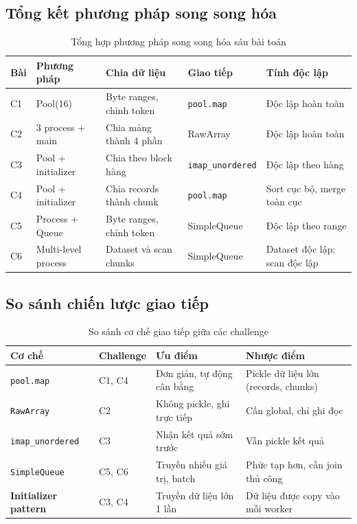 \documentclass[12pt,a4paper]{article}
\begin{document}
\subsection{Tổng kết phương pháp song song hóa}

\begin{table}[H]
\centering
\caption{Tổng hợp phương pháp song song hóa sáu bài toán}
\begingroup
\small
\setlength{\tabcolsep}{4pt}
\renewcommand{\arraystretch}{1.25}
\begin{tabularx}{\textwidth}{p{0.8cm}p{2.6cm}p{2.0cm}p{3.5cm}Y}
\toprule
\textbf{Bài} & \textbf{Phương pháp} & \textbf{Chia dữ liệu} & \textbf{Giao tiếp} & \textbf{Tính độc lập} \\
\midrule
C1 & Pool(16) & Byte ranges, chỉnh token & \texttt{pool.map} & Độc lập hoàn toàn \\
C2 & 3 process + main & Chia mảng thành 4 phần & RawArray & Độc lập hoàn toàn \\
C3 & Pool + initializer & Chia theo block hàng & \texttt{imap\_unordered} & Độc lập theo hàng \\
C4 & Pool + initializer & Chia records thành chunk & \texttt{pool.map} & Sort cục bộ, merge toàn cục \\
C5 & Process + Queue & Byte ranges, chỉnh token & SimpleQueue & Độc lập theo range \\
C6 & Multi-level process & Dataset và scan chunks & SimpleQueue & Dataset độc lập; scan độc lập \\
\bottomrule
\end{tabularx}
\endgroup
\end{table}

\subsection{So sánh chiến lược giao tiếp}

\begin{table}[H]
\centering
\caption{So sánh cơ chế giao tiếp giữa các challenge}
\begin{tabularx}{\textwidth}{p{3.5cm}p{3cm}p{4cm}Y}
\toprule
\textbf{Cơ chế} & \textbf{Challenge} & \textbf{Ưu điểm} & \textbf{Nhược điểm} \\
\midrule
\texttt{pool.map} & C1, C4 & Đơn giản, tự động cân bằng & Pickle dữ liệu lớn (records, chunks) \\
\texttt{RawArray} & C2 & Không pickle, ghi trực tiếp & Cần global, chỉ ghi đọc \\
\texttt{imap\_unordered} & C3 & Nhận kết quả sớm trước & Vẫn pickle kết quả \\
\texttt{SimpleQueue} & C5, C6 & Truyền nhiều giá trị, batch & Phức tạp hơn, cần join thủ công \\
\midrule
\midrule
\textbf{Initializer pattern} & C3, C4 & Truyền dữ liệu lớn 1 lần & Dữ liệu được copy vào mỗi worker \\
\bottomrule
\end{tabularx}
\end{table}
\end{document}
